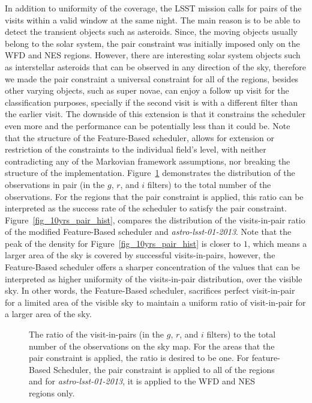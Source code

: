 \documentclass[12pt]{aastex62}
\theoremstyle{definition}
\begin{document}
In addition to uniformity of the coverage, the LSST mission calls for pairs of the visits within a valid window at the same night. The main reason is to be able to detect the transient objects such as asteroids. Since, the moving objects usually belong to the solar system, the pair constraint was initially imposed only on the WFD and NES regions. However, there are interesting solar system objects such as interstellar asteroids that can be observed in any direction of the sky, therefore we made the pair constraint a universal constraint for all of the regions, besides other varying objects, such as super novae, can enjoy a follow up visit for the classification purposes, specially if the second visit is with a different filter than the earlier visit. The downside of this extension is that it constrains the scheduler even more and the performance can be potentially less than it could be. Note that the structure of the Feature-Based scheduler, allows for extension or restriction of the constraints to the individual field's level, with neither contradicting any of the Markovian framework assumptions, nor breaking the structure of the implementation. Figure~\ref{fig_10yrs_pair} demonstrates the distribution of the observations in pair (in the $g$, $r$, and $i$ filters) to the total number of the observations. For the regions that the pair constraint is applied, this ratio can be interpreted as the success rate of the scheduler to satisfy the pair constraint. Figure~\ref{fig_10yrs_pair_hist}, compares the distribution of the visits-in-pair ratio of the modified Feature-Based scheduler and \textit{astro-lsst-01-2013}. Note that the peak of the density for Figure~\ref{fig_10yrs_pair_hist} is closer to $1$, which means a larger area of the sky is covered by successful visits-in-pairs, however, the Feature-Based scheduler offers a sharper concentration of the values that can be interpreted as higher uniformity of the visits-in-pair distribution, over the visible sky. In other words, the Feature-Based scheduler, sacrifices perfect visit-in-pair for a limited area of the visible sky to maintain a uniform ratio of visit-in-pair for a larger area of the sky.

\begin{figure}[h!]
\caption{The ratio of the visit-in-pairs (in the $g$, $r$, and $i$ filters) to the total number of the observations on the sky map. For the areas that the pair constraint is applied, the ratio is desired to be one. For feature-Based Scheduler, the pair constraint is applied to all of the regions and for \textit{astro-lsst-01-2013}, it is applied to the WFD and NES regions only.}
\label{fig_10yrs_pair}
\end{figure}
\end{document}
